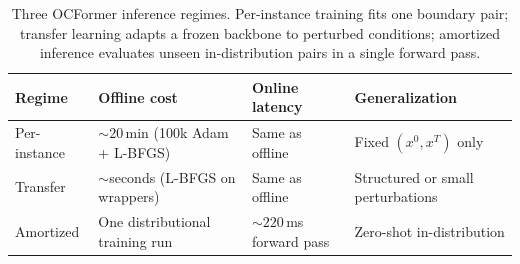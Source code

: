 \begin{table}[htbp]
  \centering
  \caption{Three OCFormer inference regimes. Per-instance training fits one boundary pair; transfer learning adapts a frozen backbone to perturbed conditions; amortized inference evaluates unseen in-distribution pairs in a single forward pass.}
  \label{tab:oc:regimes}
  \small
  \begin{tabular}{@{}
    >{\raggedright\arraybackslash}p{}
    >{\raggedright\arraybackslash}p{}
    >{\raggedright\arraybackslash}p{}
    >{\raggedright\arraybackslash}p{}@{}}
    \toprule
    Regime & Offline cost & Online latency & Generalization \\
    \midrule
    Per-instance & ${\sim}20$\,min (100k Adam + L-BFGS) & Same as offline & Fixed $(x^0,x^T)$ only \\
    Transfer & ${\sim}$seconds (L-BFGS on wrappers) & Same as offline & Structured or small perturbations \\
    Amortized & One distributional training run & ${\sim}220$\,ms forward pass & Zero-shot in-distribution \\
    \bottomrule
  \end{tabular}
\end{table}
